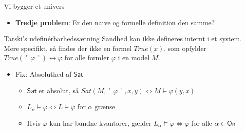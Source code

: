 \documentclass{beamer}
\renewcommand{\models}{\vDash}
\begin{document}
\begin{frame}{Vi bygger et univers}
\begin{itemize}
\item \textbf{Tredje problem}: Er den naive og formelle definition den samme?
\end{itemize}

\pause\begin{block}{Tarski's udefinérbarhedssætning}
\pause Sandhed kan ikke defineres internt i et system. \pause Mere specifikt, så findes der ikke en formel $True(x)$, som opfylder $True(\ulcorner\varphi\urcorner)\leftrightarrow\varphi$ for alle formler $\varphi$ i en model $M$.
\end{block}

\begin{itemize}
\pause\item Fix: Absoluthed af $\mathsf{Sat}$
\begin{itemize}
	\pause\item $\mathsf{Sat}$ er absolut, så $Sat(M,\ulcorner\varphi\urcorner,\overline{x},y)\Leftrightarrow M\models\varphi(y,\overline{x})$
	\pause\item $L_\alpha\models\varphi\Leftrightarrow L\models\varphi$ for $\alpha$ grænse
	\pause\item Hvis $\varphi$ kun har bundne kvantorer, gælder $L_\alpha\models\varphi\Leftrightarrow\varphi$ for alle $\alpha\in\textsf{On}$
\end{itemize}
\end{itemize}
\end{frame}
\end{document}
